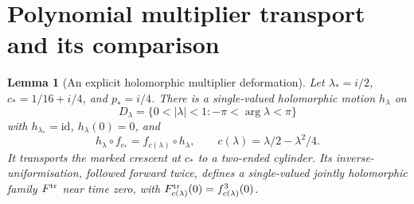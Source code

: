 \documentclass[11pt]{article}
\newtheorem{lemma}[theorem]{Lemma}
\begin{document}
\section{Polynomial multiplier transport and its comparison}
\begin{lemma}[An explicit holomorphic multiplier deformation]\label{lem:surgery}
Let $\lambda_*=i/2$, $c_*=1/16+i/4$, and $p_*=i/4$.
There is a single-valued holomorphic motion $h_\lambda$ on
\[
 D_\lambda=\{0<|\lambda|<1:-\pi<\arg\lambda<\pi\}
\]
with $h_{\lambda_*}=\mathrm{id}$, $h_\lambda(0)=0$, and
\[
 h_\lambda\circ f_{c_*}=f_{c(\lambda)}\circ h_\lambda,
 \qquad c(\lambda)=\lambda/2-\lambda^2/4.
\]
It transports the marked crescent at $c_*$ to a two-ended cylinder.
Its inverse-uniformisation, followed forward twice, defines a
single-valued jointly holomorphic family $F^{\rm tr}$ near time zero,
with $F^{\rm tr}_{c(\lambda)}(0)=f_{c(\lambda)}^3(0)$.
\end{lemma}
\end{document}
